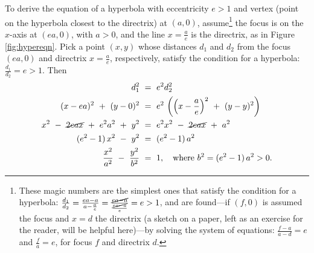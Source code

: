 \piccaption[]{\label{fig:hypereqn}}
To derive the equation of a hyperbola with eccentricity $e>1$ and vertex
(point on the hyperbola closest to the directrix) at $(a,0)$,
assume\footnote{These magic numbers are the simplest ones that satisfy the condition for a hyperbola:
$\frac{d_1}{d_2}=\frac{ea-a}{a-\frac{a}{e}}=\frac{\cancel{ea-a}}{\frac{\cancel{ea-a}}{e}}=e>1$, and are found---if $(f,0)$ is assumed the focus and $x=d$ the directrix (a sketch on a paper, left as an exercise for the reader, will be helpful here)---by solving the system of equations: $\frac{f-a}{a-d}=e$ and $\frac{f}{a}=e$, for focus $f$ and directrix $d$.} the focus
is on the $x$-axis at $(ea,0)$, with $a>0$, and the line $x=\frac{a}{e}$ is the
directrix, as in Figure \ref{fig:hypereqn}. Pick a point $(x,y)$ whose distances
$d_1$ and $d_2$ from the focus $(ea,0)$ and directrix $x=\frac{a}{e}$,
respectively, satisfy the condition for a hyperbola: $\frac{d_1}{d_2}=e>1$.
Then
{
\setlength{\abovedisplayskip}{0.0em}
\setlength{\belowdisplayskip}{0.0em}
\addtolength{\jot}{-0.25em}
\begin{align*}
d_1^2 ~&=~ e^2 d_2^2\\
(x-ea)^2 ~+~ (y-0)^2 ~&=~ e^2\,\left(\left(x-\frac{a}{e}\right)^2 ~+~ (y-y)^2\right)\\
x^2 ~-~ \cancel{2eax} ~+~ e^2a^2 ~+~ y^2 ~&=~ e^2x^2 ~-~ \cancel{2eax} ~+~ a^2\\
(e^2 - 1)\,x^2 ~-~ y^2 ~&=~ (e^2 - 1)\,a^2\\
\frac{x^2}{a^2} ~-~ \frac{y^2}{b^2} ~&=~ 1, \quad\text{where $b^2 = (e^2 - 1)\,a^2 > 0$.}
\end{align*}
}
